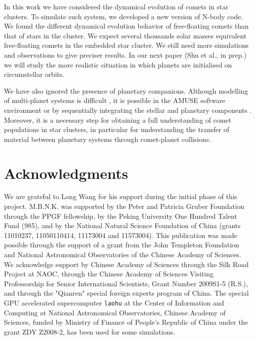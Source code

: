 \documentclass[usenatbib]{mnras}
\begin{document}


In this work we have considered the dynamical evolution of comets in star clusters. To simulate such system, we developed a new version of N-body code. We found the different dynamical evolution behavior of free-floating comets than that of stars in the cluster. We expect several thousands solar masses equivalent free-floating comets in the embedded star cluster. We still need more simulations and observations to give preciser results.
In our next paper (Shu et al., in prep.) we will study the more realistic situation in which planets are initialised on circumstellar orbits. 

We have also ignored the presence of planetary companions. Although modelling of multi-planet systems is difficult \citep[][]{Hao:2013aa, Shara:2016aa}, it is possible in the AMUSE software environment \citep[see][]{Portegies-Zwart:2013aa, Pelupessy:2013aa, Cai:2016aa} or by sequentially integrating the stellar and planetary components \citep[][]{Cai:2015aa}. Moreover, it is a necessary step for obtaining a full understanding of comet populations in star clusters, in particular for understanding the transfer of material between planetary systems through comet-planet collisions. 


\section*{Acknowledgments}
We are grateful to Long Wang for his support during the initial phase of this project.
M.B.N.K. was supported by the Peter and Patricia Gruber Foundation through the PPGF fellowship, by the Peking University One Hundred Talent Fund (985), and by the National Natural Science Foundation of China (grants 11010237, 11050110414, 11173004 and 11573004). 
This publication was made possible through the support of a grant from 
the John Templeton Foundation and National Astronomical Observatories of the
Chinese Academy of Sciences. 
We acknowledge support by Chinese Academy of Sciences through the Silk Road
Project at NAOC, through the Chinese Academy of Sciences Visiting Professorship for Senior International Scientists, Grant Number 2009S1-5 (R.S.), and through the "Qianren" special foreign experts program of China.
The special GPU accelerated supercomputer {\tt laohu} at the Center of Information and
Computing at National Astronomical Observatories, Chinese Academy of Sciences, funded by Ministry of Finance of People's Republic of China under the grant ZDY Z2008-2, has been used for some simulations. 
\end{document}
